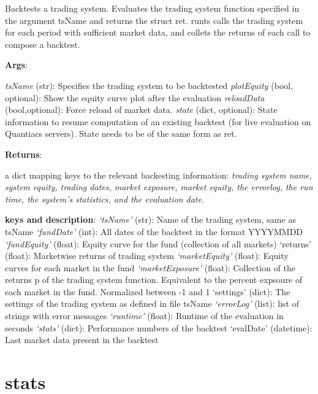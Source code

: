 \documentclass[letterpaper,10pt,english]{sphinxmanual}
\begin{document}
Backtests a trading system. Evaluates the trading system function specified in the argument tsName and returns the struct ret. runts calls the trading system for each period with sufficient market data, and collets the returns of each call to compose a backtest.

\textbf{Args}:

\emph{tsName} (str): Specifies the trading system to be backtested
\emph{plotEquity} (bool, optional): Show the equity curve plot after the evaluation
\emph{reloadData} (bool,optional): Force reload of market data.
\emph{state} (dict, optional): State information to resume computation of an existing backtest (for live evaluation on Quantiacs servers). State needs to be of the same form as ret.

\textbf{Returns}:

a dict mapping keys to the relevant backesting information: \emph{trading system name, system equity, trading dates, market exposure, market equity, the errorlog, the run time, the system’s statistics, and the evaluation date}.

\textbf{keys and description}:
\emph{‘tsName’} (str): Name of the trading system, same as tsName
\emph{‘fundDate’} (int): All dates of the backtest in the format YYYYMMDD
\emph{‘fundEquity’} (float): Equity curve for the fund (collection of all markets) ‘returns’ (float): Marketwise returns of trading system
\emph{‘marketEquity’} (float): Equity curves for each market in the fund
\emph{‘marketExposure’} (float): Collection of the returns p of the trading system function. Equivalent to the percent expsoure of each market in the fund. Normalized between -1 and 1 ‘settings’ (dict): The settings of the trading system as defined in file tsName
\emph{‘errorLog’} (list): list of strings with error messages
\emph{‘runtime’} (float): Runtime of the evaluation in seconds
\emph{‘stats’} (dict): Performance numbers of the backtest ‘evalDate’ (datetime): Last market data present in the backtest


\section{stats}
\label{reference:stats}

\begin{fulllineitems}
\label{reference:quantiacsToolbox.stats}
\end{fulllineitems}
\end{document}
